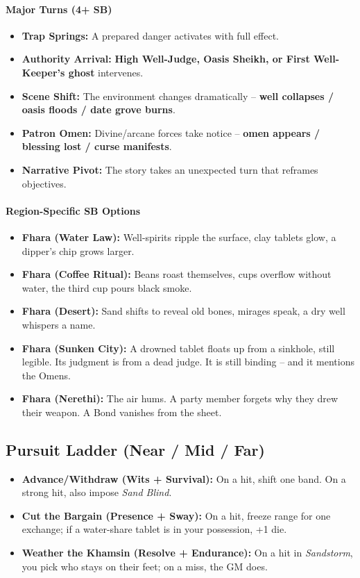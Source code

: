 \paragraph{Major Turns (4+ SB)}
\begin{itemize}
\item \textbf{Trap Springs:} A prepared danger activates with full effect.
\item \textbf{Authority Arrival:} \textbf{High Well-Judge, Oasis Sheikh, or First Well-Keeper's ghost} intervenes.
\item \textbf{Scene Shift:} The environment changes dramatically -- \textbf{well collapses / oasis floods / date grove burns}.
\item \textbf{Patron Omen:} Divine/arcane forces take notice -- \textbf{omen appears / blessing lost / curse manifests}.
\item \textbf{Narrative Pivot:} The story takes an unexpected turn that reframes objectives.
\end{itemize}

\paragraph{Region-Specific SB Options}
\begin{itemize}
\item \textbf{Fhara (Water Law):} Well-spirits ripple the surface, clay tablets glow, a dipper's chip grows larger.
\item \textbf{Fhara (Coffee Ritual):} Beans roast themselves, cups overflow without water, the third cup pours black smoke.
\item \textbf{Fhara (Desert):} Sand shifts to reveal old bones, mirages speak, a dry well whispers a name.
\item \textbf{Fhara (Sunken City):} A drowned tablet floats up from a sinkhole, still legible. Its judgment is from a dead judge. It is still binding -- and it mentions the Omens.
\item \textbf{Fhara (Nerethi):} The air hums. A party member forgets why they drew their weapon. A Bond vanishes from the sheet.
\end{itemize}

\subsection*{Pursuit Ladder (Near / Mid / Far)}
\begin{itemize}
\item \textbf{Advance/Withdraw (Wits + Survival):} On a hit, shift one band. On a strong hit, also impose \emph{Sand Blind}.
\item \textbf{Cut the Bargain (Presence + Sway):} On a hit, freeze range for one exchange; if a water-share tablet is in your possession, +1 die.
\item \textbf{Weather the Khamsin (Resolve + Endurance):} On a hit in \emph{Sandstorm}, you pick who stays on their feet; on a miss, the GM does.
\end{itemize}

